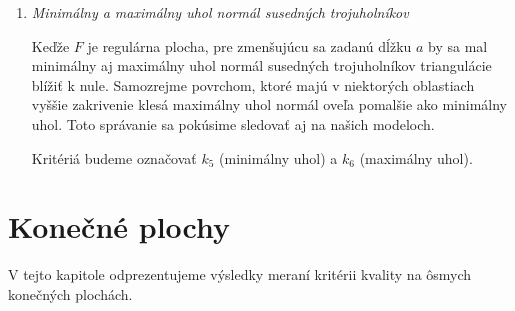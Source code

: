 \begin{enumerate}
{    Kritérium budeme označovať $k_4$.
}
\item{
    \textit{Minimálny a maximálny uhol normál susedných trojuholníkov}

    Keďže $F$ je regulárna plocha, pre zmenšujúcu sa zadanú dĺžku $a$ by sa mal minimálny aj maximálny 
    uhol normál susedných trojuholníkov triangulácie blížiť k nule. Samozrejme povrchom, ktoré majú 
    v niektorých oblastiach vyššie zakrivenie klesá maximálny uhol normál oveľa pomalšie ako minimálny
    uhol. Toto správanie sa pokúsime sledovať aj na našich modeloch.

    Kritériá budeme označovať $k_5$ (minimálny uhol) a $k_6$ (maximálny uhol).
}
\end{enumerate}

\section{Konečné plochy}

V tejto kapitole odprezentujeme výsledky meraní kritérii kvality na ôsmych konečných plochách.

\newpage

